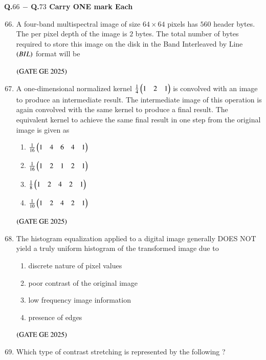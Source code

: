 \documentclass[journal,12pt,onecolumn]{IEEEtran}
\theoremstyle{remark}
\begin{document}
\textbf{Q.$66$ $-$ Q.$73$ Carry ONE mark Each}
\bigskip
\begin{enumerate}
\setcounter{enumi}{65}
\item A four-band multispectral image of size $64 \times 64$ pixels has $560$ header bytes.
The per pixel depth of the image is $2$ bytes.
The total number of bytes required to store this image on the disk in the Band Interleaved by Line $\left(BIL\right)$ format will be
\begin{enumerate}
\end{enumerate}
\hfill $\left(\text{GATE GE 2025}\right)$
\bigskip
\item A one-dimensional normalized kernel $\frac{1}{4}\begin{pmatrix}1 & 2 & 1\end{pmatrix}$ is convolved with an image to produce an intermediate result.
The intermediate image of this operation is again convolved with the same kernel to produce a final result.
The equivalent kernel to achieve the same final result in one step from the original image is given as
\begin{enumerate}
\item $\frac{1}{16}\begin{pmatrix}1 & 4 & 6 & 4 & 1\end{pmatrix}$
\item $\frac{1}{16}\begin{pmatrix}1 & 2 & 1 & 2 & 1\end{pmatrix}$
\item $\frac{1}{8}\begin{pmatrix}1 & 2 & 4 & 2 & 1\end{pmatrix}$
\item $\frac{1}{10}\begin{pmatrix}1 & 2 & 4 & 2 & 1\end{pmatrix}$
\end{enumerate}
\hfill $\left(\text{GATE GE 2025}\right)$
\bigskip
\item The histogram equalization applied to a digital image generally DOES NOT yield a truly uniform histogram of the transformed image due to
\begin{enumerate}
\item discrete nature of pixel values
\item poor contrast of the original image
\item low frequency image information
\item 
presence of edges
\end{enumerate}
\hfill $\left(\text{GATE GE 2025}\right)$
\bigskip
\item Which type of contrast stretching is represented by the following ?\\

\end{enumerate}
\end{document}
